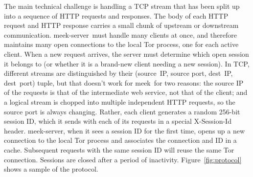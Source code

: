 \documentclass[conference]{IEEEtran}
\def\meekserver{\mbox{meek-server}}
\def\meek{meek}
\begin{document}
The main technical challenge is handling a TCP stream
that has been split up into a sequence of HTTP requests and responses.
The body of each HTTP request and HTTP response carries
a small chunk of upstream or downstream communication.
\meekserver\ must handle many clients at once,
and therefore maintains many open connections to the local Tor process,
one for each active client.
When a new request arrives, the server must determine which
open session it belongs to
(or whether it is a brand-new client needing a new session).
In TCP, different streams are distinguished by their
(source~IP, source port, dest~IP, dest~port) tuple,
but that doesn't work for \meek\ for two reasons:
the source IP of the requests is that of the intermediate web service,
not that of the client;
and a logical stream is chopped into multiple independent HTTP requests,
so the source port is always changing.
Rather, each client generates a random 256-bit session ID,
which it sends with each of its requests in a special
X-Session-Id header.
\meekserver, when it sees a session ID for the first time,
opens up a new connection to the local Tor process
and associates the connection and ID in a cache.
Subsequent requests with the
same session ID will reuse the same Tor connection.
Sessions are closed after a period of inactivity.
Figure~\ref{fig:protocol} shows a sample of the protocol.
\end{document}
